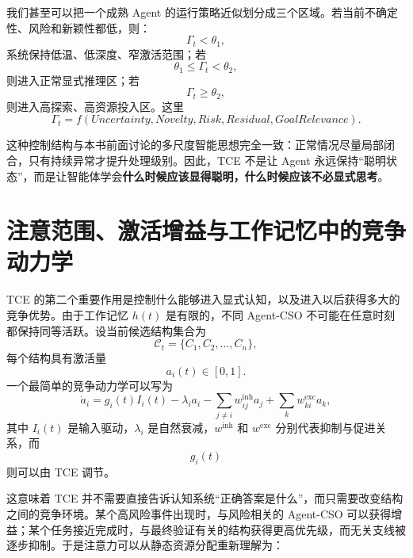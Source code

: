 我们甚至可以把一个成熟 Agent 的运行策略近似划分成三个区域。若当前不确定性、风险和新颖性都低，则：
\begin{equation}
    \Gamma_t<\theta_1,
\end{equation}
系统保持低温、低深度、窄激活范围；若
\begin{equation}
    \theta_1\le \Gamma_t<\theta_2,
\end{equation}
则进入正常显式推理区；若
\begin{equation}
    \Gamma_t\ge \theta_2,
\end{equation}
则进入高探索、高资源投入区。这里
\begin{equation}
    \Gamma_t
    =
    f(
    Uncertainty,
    Novelty,
    Risk,
    Residual,
    GoalRelevance
    ).
\end{equation}

这种控制结构与本书前面讨论的多尺度智能思想完全一致：正常情况尽量局部闭合，只有持续异常才提升处理级别。因此，TCE 不是让 Agent 永远保持“聪明状态”，而是让智能体学会\textbf{什么时候应该显得聪明，什么时候应该不必显式思考}。

\section{注意范围、激活增益与工作记忆中的竞争动力学}

TCE 的第二个重要作用是控制什么能够进入显式认知，以及进入以后获得多大的竞争优势。由于工作记忆 $h(t)$ 是有限的，不同 Agent-CSO 不可能在任意时刻都保持同等活跃。设当前候选结构集合为
\begin{equation}
    \mathcal C_t
    =
    \{C_1,C_2,\ldots,C_n\},
\end{equation}
每个结构具有激活量
\begin{equation}
    a_i(t)\in[0,1].
\end{equation}
一个最简单的竞争动力学可以写为
\begin{equation}
    \dot a_i
    =
    g_i(t)
    I_i(t)
    -
    \lambda_i a_i
    -
    \sum_{j\ne i}
    w_{ij}^{\mathrm{inh}}a_j
    +
    \sum_{k}
    w_{ki}^{\mathrm{exc}}a_k,
\end{equation}
其中 $I_i(t)$ 是输入驱动，$\lambda_i$ 是自然衰减，$w^{\mathrm{inh}}$ 和 $w^{\mathrm{exc}}$ 分别代表抑制与促进关系，而
\begin{equation}
    g_i(t)
\end{equation}
则可以由 TCE 调节。

这意味着 TCE 并不需要直接告诉认知系统“正确答案是什么”，而只需要改变结构之间的竞争环境。某个高风险事件出现时，与风险相关的 Agent-CSO 可以获得增益；某个任务接近完成时，与最终验证有关的结构获得更高优先级，而无关支线被逐步抑制。于是注意力可以从静态资源分配重新理解为：
\begin{statementbox}
\centering
{}
\end{statementbox}

